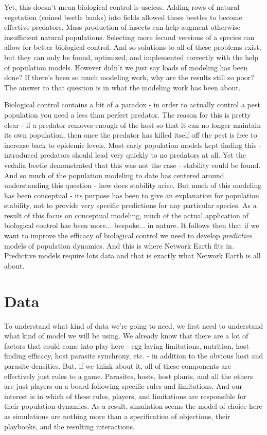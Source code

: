 \documentclass[11pt,a5paper]{book}
\begin{document}
Yet, this doesn't mean biological control is useless. Adding rows of natural vegetation (coined beetle banks) into fields allowed those beetles to become effective predators. Mass production of insects can help augment otherwise insufficient natural populations. Selecting more fecund versions of a species can allow for better biological control. And so solutions to all of these problems exist, but they can only be found, optimized, and implemented correctly with the help of population models. However didn't we just say loads of modeling has been done? If there's been so much modeling work, why are the results still so poor? The answer to that question is in what the modeling work has been about. 
\newline

Biological control contains a bit of a paradox - in order to actually control a pest population you need a less than perfect predator. The reason for this is pretty clear - if a predator removes enough of the host so that it can no longer maintain its own population, then once the predator has killed itself off the pest is free to increase back to epidemic levels. Most early population models kept finding this - introduced predators should lead very quickly to no predators at all. Yet the vedalia beetle demonstrated that this was not the case - stability could be found. And so much of the population modeling to date has centered around understanding this question - how does stability arise. But much of this modeling has been conceptual - its purpose has been to give an explanation for population stability, not to provide very specific predictions for any particular species. As a result of this focus on conceptual modeling, much of the actual application of biological control has been more... bespoke... in nature. It follows then that if we want to improve the efficacy of biological control we need to develop \textit{predictive} models of population dynamics. And this is where Network Earth fits in. Predictive models require lots data and that is exactly what Network Earth is all about.

\section{Data}
To understand what kind of data we're going to need, we first need to understand what kind of model we will be using. We already know that there are a lot of factors that could come into play here - egg laying limitations, nutrition, host finding efficacy, host parasite synchrony, etc. - in addition to the obvious host and parasite densities. But, if we think about it, all of these components are effectively just rules to a game. Parasites, hosts, host plants, and all the others are just players on a board following specific rules and limitations. And our interest is in which of these rules, players, and limitations are responsible for their population dynamics. As a result, simulation seems the model of choice here as simulations are nothing more than a specification of objections, their playbooks, and the resulting interactions. 
\newline 
\end{document}

